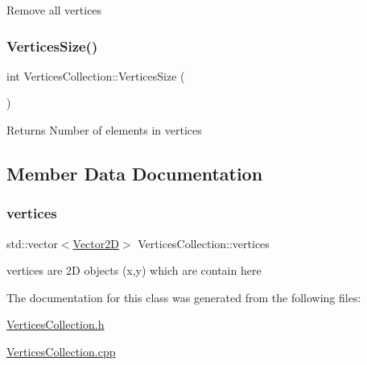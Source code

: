 Remove all vertices \mbox{\label{classVerticesCollection_a357dc6b6248ad83862febe8a952abb3a}} 
\subsubsection{\texorpdfstring{Vertices\+Size()}{VerticesSize()}}
{\footnotesize\ttfamily int Vertices\+Collection\+::\+Vertices\+Size (\begin{DoxyParamCaption}{ }\end{DoxyParamCaption})}

\begin{DoxyReturn}{Returns}
Number of elements in vertices 
\end{DoxyReturn}


\subsection{Member Data Documentation}
\mbox{\label{classVerticesCollection_a64d15f51448714e039aa2a6abd8839cf}} 
\subsubsection{\texorpdfstring{vertices}{vertices}}
{\footnotesize\ttfamily std\+::vector$<$\hyperlink{Vector2D_8h_a2a0274942d24318d2654bd0f75c54fb7}{Vector2D}$>$ Vertices\+Collection\+::vertices\hspace{0.3cm}{\ttfamily [private]}}

vertices are 2D objects (x,y) which are contain here 

The documentation for this class was generated from the following files\+:\begin{DoxyCompactItemize}
\item 
\hyperlink{VerticesCollection_8h}{Vertices\+Collection.\+h}\item 
\hyperlink{VerticesCollection_8cpp}{Vertices\+Collection.\+cpp}\end{DoxyCompactItemize}
